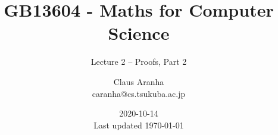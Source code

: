 \documentclass[aspectratio=169]{beamer}
\title[GB13604]{GB13604 - Maths for Computer Science}
\subtitle[]{Lecture 2 -- Proofs, Part 2}
\author[Claus Aranha]{Claus Aranha\\{\footnotesize caranha@cs.tsukuba.ac.jp}}
\institute[COINS]{College of Information Science}
\date[2020-10-14]{2020-10-14\\{\tiny Last updated \today}}
\begin{document}


\begin{frame}
  \maketitle
\end{frame}







\end{document}
